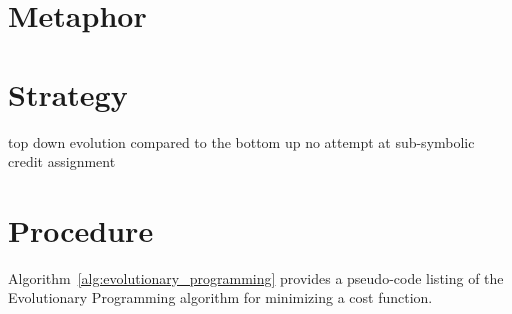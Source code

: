 \documentclass[a4paper, 11pt]{article}
\begin{document}
\section{Metaphor}
\label{sec:metaphor}


\section{Strategy}
\label{sec:strategy}

top down evolution compared to the bottom up
no attempt at sub-symbolic credit assignment

\section{Procedure}
\label{sec:procedure}
Algorithm~\ref{alg:evolutionary_programming} provides a pseudo-code listing of the Evolutionary Programming algorithm for minimizing a cost function. 
\end{document}
